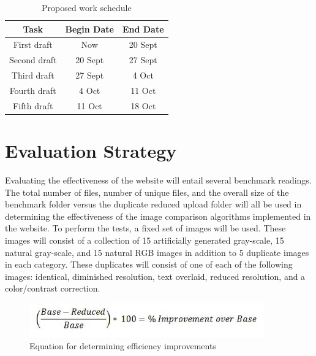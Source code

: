 \documentclass[11pt]{article}
\begin{document}
\begin{table}[htbp]
\centering
\begin{tabular}{|c||c|c|}
\hline
\bf Task & \bf Begin Date & \bf End Date\\\hline\hline
First draft & Now & 20 Sept\\\hline
Second draft & 20 Sept & 27 Sept\\\hline
Third draft & 27 Sept & 4 Oct\\\hline
Fourth draft & 4 Oct & 11 Oct\\\hline
Fifth draft & 11 Oct & 18 Oct\\\hline
\end{tabular}
\caption{Proposed work schedule}
\label{intro-tab1}
\end{table}

\vspace*{-.2in}
\section{Evaluation Strategy}
\label{sec:evaluate}
\vspace*{-.1in}


Evaluating the effectiveness of the website will entail several benchmark readings. The total number of files, number of unique files, and the overall size of the benchmark folder versus the duplicate reduced upload folder will all be used in determining the effectiveness of the image comparison algorithms implemented in the website. To perform the tests, a fixed set of images will be used. These images will consist of a collection of 15 artificially generated gray-scale, 15 natural gray-scale, and 15 natural RGB images in addition to 5 duplicate images in each category. These duplicates will consist of one of each of the following images: identical, diminished resolution, text overlaid, reduced resolution, and a color/contrast correction.

\begin{figure}[htbp]
\centering
\includegraphics[width=4in]{benchmark_eq}
\caption{Equation for determining efficiency improvements}
\label{benchmark_eq}
\end{figure}
\end{document}
